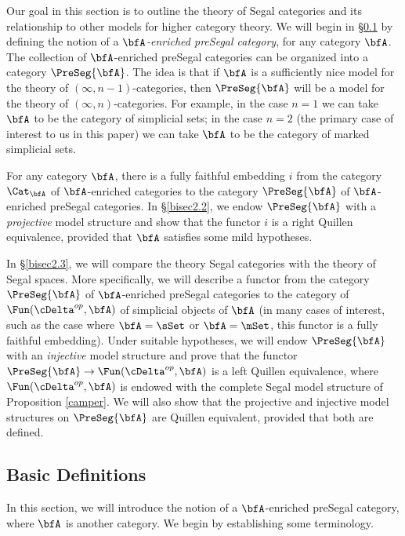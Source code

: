 Our goal in this section is to outline the theory of Segal categories and its relationship to other models
for higher category theory. We will begin in \S \ref{bisec2.1} by defining the notion of a
{\it $\bfA$-enriched preSegal category}, for any category $\bfA$. The collection of 
$\bfA$-enriched preSegal categories can be organized into a category $\PreSeg{\bfA}$.
The idea is that if $\bfA$ is a sufficiently nice model for the theory of $(\infty,n-1)$-categories, then 
$\PreSeg{\bfA}$ will be a model for the theory of $(\infty,n)$-categories. For example, in the
case $n=1$ we can take $\bfA$ to be the category of simplicial sets; in the case
$n=2$ (the primary case of interest to us in this paper) we can take $\bfA$ to be the category
of marked simplicial sets.

For any category $\bfA$, there is a fully faithful embedding $i$ from the category
$\Cat_{\bfA}$ of $\bfA$-enriched categories to the category $\PreSeg{\bfA}$ of $\bfA$-enriched
preSegal categories. In \S \ref{bisec2.2}, we endow $\PreSeg{\bfA}$ with a {\it projective} model structure and show that the functor $i$ is a right Quillen equivalence, provided that
$\bfA$ satisfies some mild hypotheses.

In \S \ref{bisec2.3}, we will compare the theory Segal categories with the theory of
Segal spaces. More specifically, we will describe a functor from the category
$\PreSeg{\bfA}$ of $\bfA$-enriched preSegal categories to the category of
$\Fun( \cDelta^{op}, \bfA)$ of simplicial objects of $\bfA$ (in many cases of interest, such
as the case where $\bfA = \sSet$ or $\bfA = \mSet$, this functor is a fully faithful embedding).
Under suitable hypotheses, we will endow $\PreSeg{\bfA}$ with an {\it injective} model structure and prove that the functor $\PreSeg{\bfA} \rightarrow \Fun( \cDelta^{op}, \bfA)$ is a left Quillen equivalence, where $\Fun( \cDelta^{op}, \bfA)$ is endowed with the complete Segal model structure
of Proposition \ref{camper}. We will also show that the projective and injective model
structures on $\PreSeg{\bfA}$ are Quillen equivalent, provided that both are defined.

\subsection{Basic Definitions}\label{bisec2.1}

In this section, we will introduce the notion of a $\bfA$-enriched preSegal category, where
$\bfA$ is another category. We begin by establishing some terminology.

